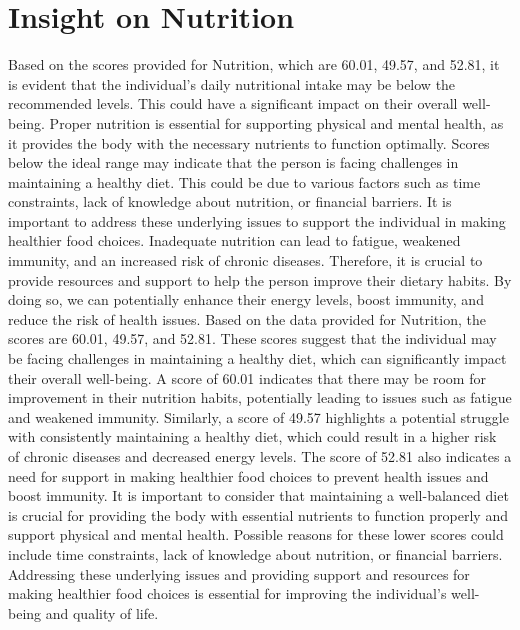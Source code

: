 \documentclass[10pt, a4paper]{article}%
\begin{document}
%
\section{Insight on Nutrition}%
\label{sec:InsightonNutrition}%
Based on the scores provided for Nutrition, which are 60.01, 49.57, and 52.81, it is evident that the individual's daily nutritional intake may be below the recommended levels. This could have a significant impact on their overall well{-}being. Proper nutrition is essential for supporting physical and mental health, as it provides the body with the necessary nutrients to function optimally.\newline%
\newline%
Scores below the ideal range may indicate that the person is facing challenges in maintaining a healthy diet. This could be due to various factors such as time constraints, lack of knowledge about nutrition, or financial barriers. It is important to address these underlying issues to support the individual in making healthier food choices.\newline%
\newline%
Inadequate nutrition can lead to fatigue, weakened immunity, and an increased risk of chronic diseases. Therefore, it is crucial to provide resources and support to help the person improve their dietary habits. By doing so, we can potentially enhance their energy levels, boost immunity, and reduce the risk of health issues.\newline%
\newline%
Based on the data provided for Nutrition, the scores are 60.01, 49.57, and 52.81. These scores suggest that the individual may be facing challenges in maintaining a healthy diet, which can significantly impact their overall well{-}being. A score of 60.01 indicates that there may be room for improvement in their nutrition habits, potentially leading to issues such as fatigue and weakened immunity. Similarly, a score of 49.57 highlights a potential struggle with consistently maintaining a healthy diet, which could result in a higher risk of chronic diseases and decreased energy levels. The score of 52.81 also indicates a need for support in making healthier food choices to prevent health issues and boost immunity.\newline%
\newline%
It is important to consider that maintaining a well{-}balanced diet is crucial for providing the body with essential nutrients to function properly and support physical and mental health. Possible reasons for these lower scores could include time constraints, lack of knowledge about nutrition, or financial barriers. Addressing these underlying issues and providing support and resources for making healthier food choices is essential for improving the individual's well{-}being and quality of life.%
\end{document}
